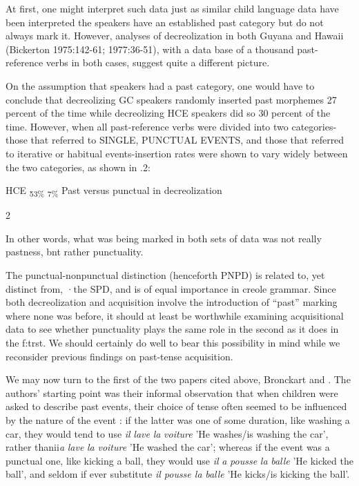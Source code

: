 At first, one might interpret such data just as similar child language data have been interpreted the speakers have an established past category but do not always mark it. However, analyses of de\-creolization in both Guyana and Hawaii (Bickerton 1975:142-61; 1977:36-51), with a data base of a thousand past-reference verbs in both cases, suggest quite a different picture.

On the assumption that speakers had a past category, one would have to conclude that decreolizing GC speakers randomly inserted past morphemes 27 percent of the time while decreolizing HCE speak\-ers did so 30 percent of the time. However, when all past-reference verbs were divided into two categories-those that referred to SINGLE, PUNCTUAL EVENTS, and those that referred to iterative or habitual events-insertion rates were shown to vary widely between the two categories, as shown in .2:



\begin{table}
HCE \textsubscript{53\% }\textsubscript{7\%}
Past versus punctual in decreolization
\caption{2}
\label{tab:3}
\end{table}


In other words, what was being marked in both sets of data was not really pastness, bnt rather punctuality.

The punctual-nonpunctual distinction (henceforth PNPD) is related to, yet distinct from, ·the SPD, and is of equal importance in creole grammar. Since both decreolization and acquisition involve the introduction of ``past'' marking where none was before, it should at least be worthwhile examining acquisitional data to see whether punctuality plays the same role in the second as it does in the f:trst. We should certainly do well to bear this possibility in mind while we reconsider previous findings on past-tense acquisition.

We may now turn to the first of the two papers cited above, Bronckart and \citet{Sinclair1973}. The authors' starting point was their informal observation that when children were asked to describe past events, their choice of tense often seemed to be influenced by the nature of the event : if the latter was one of some duration, like washing a car, they would tend to use \textit{il} \textit{lave} \textit{la} \textit{voiture} 'He washes/is washing the car', rather thanii\textit{a} \textit{lave} \textit{la} \textit{voiture }'He washed the car'; whereas if the
event was a punctual one, like kicking a ball, they would use \textit{il} \textit{a} \textit{pousse}%
\textit{la} \textit{balle} 'He kicked the ball', and seldom if ever substitute \textit{il pousse la}
\textit{balle} 'He kicks/is kicking the ball'.

